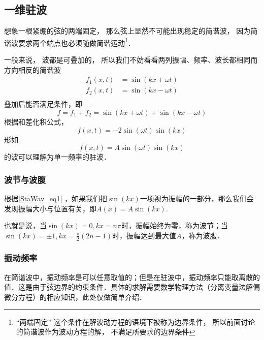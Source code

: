 
\begin{issues}
\issueDraft
\end{issues}


\subsection{一维驻波}
想象一根紧绷的弦的两端固定， 那么弦上显然不可能出现稳定的简谐波， 因为简谐波要求两个端点也必须随做简谐运动\footnote{“两端固定” 这个条件在解波动方程的语境下被称为边界条件， 所以前面讨论的简谐波作为波动方程的解， 不满足所要求的边界条件}．

一般来说， 波都是可叠加的， 所以我们不妨看看两列振幅、频率、波长都相同而方向相反的简谐波
$$
\begin{aligned}
f_1(x,t)&=\sin(kx+\omega t)\\
f_2(x,t)&=\sin(kx-\omega t)\\
\end{aligned}
$$
叠加后能否满足条件，即
$$f=f_1+f_2=\sin(kx+\omega t)+\sin(kx-\omega t)$$
根据和差化积公式，
\begin{equation}
f(x,t)=-2\sin(\omega t)\sin(kx)
\end{equation}
形如
\begin{equation}\label{StaWav_eq1}
f(x,t)=A\sin(\omega t)\sin(kx)
\end{equation}
的波可以理解为单一频率的驻波．

\subsubsection{波节与波腹}
根据\autoref{StaWav_eq1} ，如果我们把$\sin(kx)$一项视为振幅的一部分，那么我们会发现振幅大小与位置有关，即$A(x) = A \sin(kx)$.

也就是说，当$\sin(kx)=0, kx=n\pi$时，振幅始终为零，称为波节；当$\sin(kx)=\pm1, kx=\frac{\pi}{2} (2n-1)$时，振幅达到最大值$A$，称为波腹．

\subsubsection{振动频率}
在简谐波中，振动频率是可以任意取值的；但是在驻波中，振动频率只能取离散的值．这是由于弦边界的约束条件．具体的求解需要数学物理方法（分离变量法解偏微分方程）的相应知识，此处仅做简单介绍．

